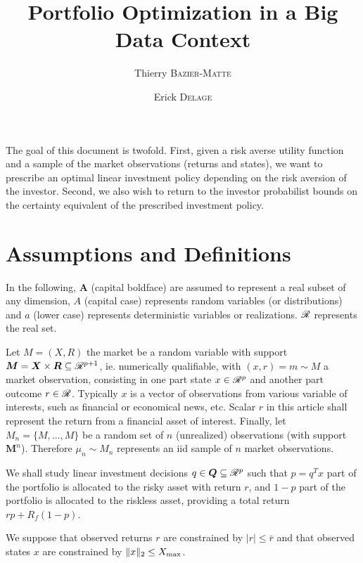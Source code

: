 \documentclass[11pt]{article}
\title{Portfolio Optimization in a Big Data Context}
\author{Thierry \textsc{Bazier-Matte} \and Erick \textsc{Delage}}
\begin{document}
\maketitle


The goal of this document is twofold. First, given a risk averse utility function and a
sample of the market observations (returns and states), we want to prescribe an optimal
linear investment policy depending on the risk aversion of the investor. Second, we also
wish to return to the investor probabilist bounds on the certainty equivalent of the
prescribed investment policy.

\section{Assumptions and Definitions}

In the following, $\bm A$ (capital boldface) are assumed to represent a real subset of any
dimension, $A$ (capital case) represents random variables (or distributions) and $a$
(lower case) represents deterministic variables or realizations. $\mathscr{R}$ represents the
real set.

Let $M=(X,R)$ the market be a random variable with support
$\bm M = \bm X\times \bm R \subseteq\mathscr{R}^{p+1}$, ie. numerically qualifiable, with
$(x,r) = m\sim M$ a market observation, consisting in one part state $x\in\mathscr{R}^p$ and
another part outcome $r\in\mathscr{R}$. Typically $x$ is a vector of observations from various
variable of interests, such as financial or economical news, etc. Scalar $r$ in this
article shall represent the return from a financial asset of interest. Finally, let
$M_n = \{M,\dots,M\}$ be a random set of $n$ (unrealized) observations (with support
$\bm M^n$). Therefore $\mu_n \sim M_n$ represents an iid sample of $n$ market
observations.

We shall study linear investment decisions $q\in\bm Q\subseteq\mathscr{R}^p$ such that $p=q^Tx$
part of the portfolio is allocated to the risky asset with return $r$, and $1-p$ part of
the portfolio is allocated to the riskless asset, providing a total return
$rp + R_f(1-p)$.
\begin{assumption}
  We suppose that observed returns $r$ are constrained by $|r| \leq \bar r$ and that
  observed states $x$ are constrained by $\|x\|_2 \leq X_{\max}$.
\end{assumption}
\end{document}
